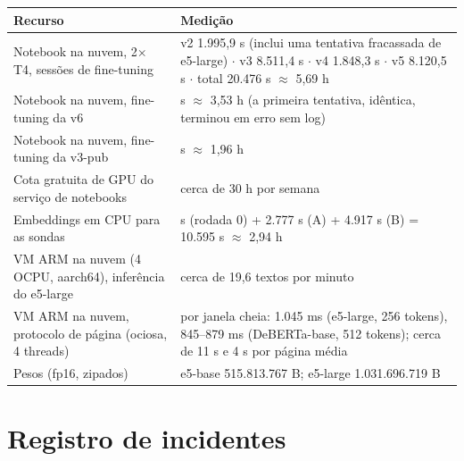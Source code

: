 \documentclass[11pt]{article}
\begin{document}
\begin{center}
\small
\begin{tabularx}{\linewidth}{@{}>{\raggedright\arraybackslash\hsize=0.79\hsize}X>{\raggedright\arraybackslash\hsize=1.21\hsize}X@{}}
\toprule
Recurso & Medição \\
\midrule
Notebook na nuvem, 2\ensuremath{\times} T4, sessões de fine-tuning & v2 1.995,9 s (inclui uma tentativa fracassada de e5-large) \ensuremath{\cdot} v3 8.511,4 s \ensuremath{\cdot} v4 1.848,3 s \ensuremath{\cdot} v5 8.120,5 s \ensuremath{\cdot} total 20.476 s \ensuremath{\approx} 5,69 h %
 \\
Notebook na nuvem, fine-tuning da v6 & 12.713 s \ensuremath{\approx} 3,53 h (a primeira tentativa, idêntica, terminou em erro sem log) %
 \\
Notebook na nuvem, fine-tuning da v3-pub & 7.056 s \ensuremath{\approx} 1,96 h %
 \\
Cota gratuita de GPU do serviço de notebooks & cerca de 30 h por semana %
 \\
Embeddings em CPU para as sondas & 2.901 s (rodada 0) + 2.777 s (A) + 4.917 s (B) = 10.595 s \ensuremath{\approx} 2,94 h %
 \\
VM ARM na nuvem (4 OCPU, aarch64), inferência do e5-large & cerca de 19,6 textos por minuto %
 \\
VM ARM na nuvem, protocolo de página (ociosa, 4 threads) & por janela cheia: 1.045 ms (e5-large, 256 tokens), 845–879 ms (DeBERTa-base, 512 tokens); cerca de 11 s e 4 s por página média %
 \\
Pesos (fp16, zipados) & e5-base 515.813.767 B; e5-large 1.031.696.719 B %
 \\
\bottomrule
\end{tabularx}
\end{center}

\section{Registro de incidentes}\label{app:B}
\end{document}
